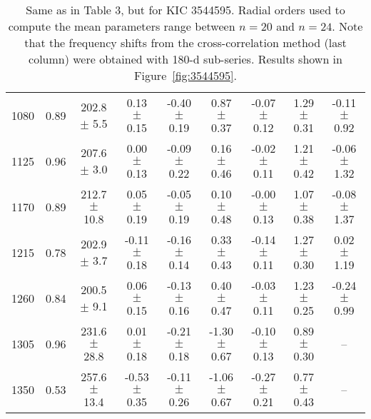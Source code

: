 \documentclass[twocolumn]{aastex61}%
\begin{document}
\begin{table*}[ht]
\begin{tabular}{ccc|ccccc|c}
1080 & 0.89 & 202.8 $\pm$ 5.5 & 0.13 $\pm$ 0.15 & -0.40 $\pm$ 0.19 & 0.87 $\pm$ 0.37 & -0.07 $\pm$ 0.12 & 1.29 $\pm$ 0.31 & -0.11 $\pm$ 0.92\\
1125 & 0.96 & 207.6 $\pm$ 3.0 & 0.00 $\pm$ 0.13 & -0.09 $\pm$ 0.22 & 0.16 $\pm$ 0.46 & -0.02 $\pm$ 0.11 & 1.21 $\pm$ 0.42 & -0.06 $\pm$ 1.32\\
1170 & 0.89 & 212.7 $\pm$ 10.8 & 0.05 $\pm$ 0.19 & -0.05 $\pm$ 0.19 & 0.10 $\pm$ 0.48 & -0.00 $\pm$ 0.13 & 1.07 $\pm$ 0.38 & -0.08 $\pm$ 1.37\\
1215 & 0.78 & 202.9 $\pm$ 3.7 & -0.11 $\pm$ 0.18 & -0.16 $\pm$ 0.14 & 0.33 $\pm$ 0.43 & -0.14 $\pm$ 0.11 & 1.27 $\pm$ 0.30 & 0.02 $\pm$ 1.19\\
1260 & 0.84 & 200.5 $\pm$ 9.1 & 0.06 $\pm$ 0.15 & -0.13 $\pm$ 0.16 & 0.40 $\pm$ 0.47 & -0.03 $\pm$ 0.11 & 1.23 $\pm$ 0.25 & -0.24 $\pm$ 0.99\\
1305 & 0.96 & 231.6 $\pm$ 28.8 & 0.01 $\pm$ 0.18 & -0.21 $\pm$ 0.18 & -1.30 $\pm$ 0.67 & -0.10 $\pm$ 0.13 & 0.89 $\pm$ 0.30 & --\\
1350 & 0.53 & 257.6 $\pm$ 13.4 & -0.53 $\pm$ 0.35 & -0.11 $\pm$ 0.26 & -1.06 $\pm$ 0.67 & -0.27 $\pm$ 0.21 & 0.77 $\pm$ 0.43 & --\\
\end{tabular}
\caption{Same as in Table 3, but for KIC 3544595. {Radial orders used to compute the mean parameters range between $n=20$ and $n=24$.} Note that the frequency shifts from the cross-correlation method (last column) were obtained with 180-d sub-series. Results shown in Figure~\ref{fig:3544595}.}\label{tab:3544595}
\end{table*}
\end{document}
